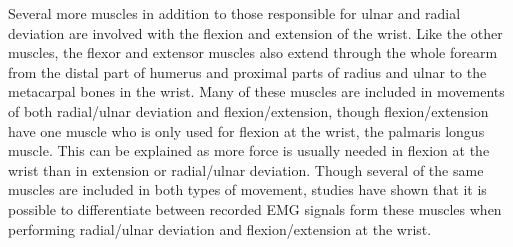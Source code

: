 Several more muscles in addition to those responsible for ulnar and radial deviation are involved with the flexion and extension of the wrist. Like the other muscles, the flexor and extensor muscles also extend through the whole forearm from the distal part of humerus and proximal parts of radius and ulnar to the metacarpal bones in the wrist. Many of these muscles are included in movements of both radial/ulnar deviation and flexion/extension, though flexion/extension have one muscle who is only used for flexion at the wrist, the palmaris longus muscle. This can be explained as more force is usually needed in flexion at the wrist than in extension or radial/ulnar deviation. 
Though several of the same muscles are included in both types of movement, studies have shown that it is possible to differentiate between recorded EMG signals form these muscles when performing radial/ulnar deviation and flexion/extension at the wrist. \cite{hahne2014}



